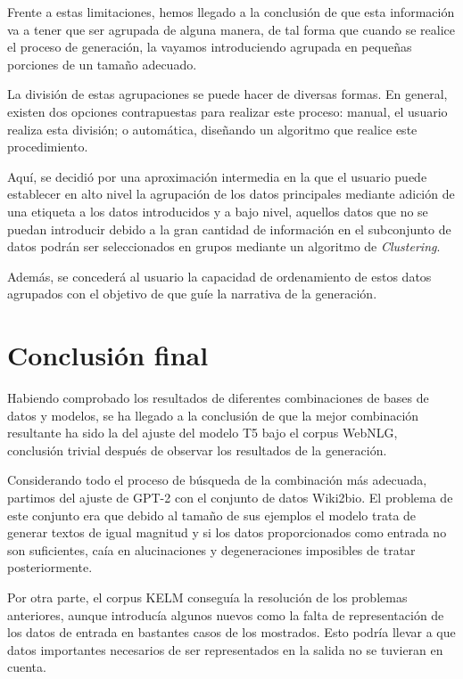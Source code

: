 Frente a estas limitaciones, hemos llegado a la conclusión de que esta información va a tener que ser agrupada de alguna manera, de tal forma que cuando se realice el proceso de generación, la vayamos introduciendo agrupada en pequeñas porciones de un tamaño adecuado. 

La división de estas agrupaciones se puede hacer de diversas formas. En general, existen dos opciones contrapuestas para realizar este proceso: manual, el usuario realiza esta división; o automática, diseñando un algoritmo que realice este procedimiento.

Aquí, se decidió por una aproximación intermedia en la que el usuario puede establecer en alto nivel la agrupación de los datos principales mediante adición de una etiqueta a los datos introducidos y a bajo nivel, aquellos datos que no se puedan introducir debido a la gran cantidad de información en el subconjunto de datos podrán ser seleccionados en grupos mediante un algoritmo de \textit{Clustering}.

Además, se concederá al usuario la capacidad de ordenamiento de estos datos agrupados con el objetivo de que guíe la narrativa de la generación.



\section{Conclusión final}

Habiendo comprobado los resultados de diferentes combinaciones de bases de datos y modelos, se ha llegado a la conclusión de que la mejor combinación resultante ha sido la del ajuste del modelo T5 bajo el corpus WebNLG, conclusión trivial después de observar los resultados de la generación. 

Considerando todo el proceso de búsqueda de la combinación más adecuada, partimos del ajuste de GPT-2 con el conjunto de datos Wiki2bio. El problema de este conjunto era que debido al tamaño de sus ejemplos el modelo trata de generar textos de igual magnitud y si los datos proporcionados como entrada no son suficientes, caía en alucinaciones y degeneraciones imposibles de tratar posteriormente. 

Por otra parte, el corpus KELM conseguía la resolución de los problemas anteriores, aunque introducía algunos nuevos como la falta de representación de los datos de entrada en bastantes casos de los mostrados. Esto podría llevar a que datos importantes necesarios de ser representados en la salida no se tuvieran en cuenta. 

